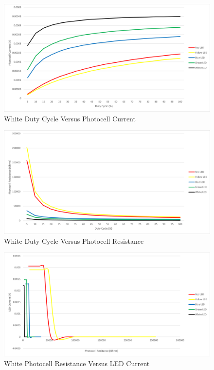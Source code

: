 \documentclass[12pt,titlepage]{article}
\begin{document}
\begin{figure}[!htb]
    \centering
    \includegraphics[width=5in]{lab_4/duty_cycle_photo_curr.png}
    \caption{White Duty Cycle Versus Photocell Current}\label{fig:white_lab_4_duty_cycle_photo_curr}
\end{figure}
\begin{figure}[!htb]
  \centering
  \includegraphics[width=5in]{lab_4/duty_cycle_photo_res.png}
  \caption{White Duty Cycle Versus Photocell Resistance}\label{fig:white_lab_4_duty_cycle_photo_res}
\end{figure}
\begin{figure}[!htb]
    \centering
    \includegraphics[width=5in]{lab_4/photo_res_led_curr.png}
    \caption{White Photocell Resistance Versus LED Current}\label{fig:white_lab_4_photo_res_led_curr}
\end{figure}
\end{document}
